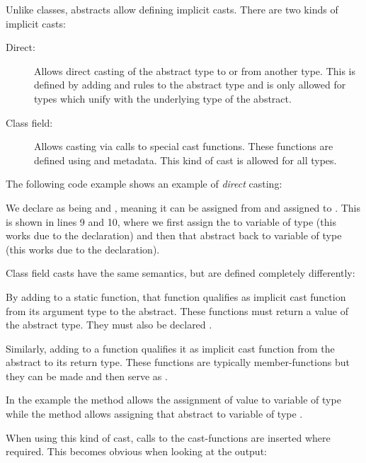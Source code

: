 Unlike classes, abstracts allow defining implicit casts. There are two kinds of implicit casts:

\begin{description}
	\item[Direct:] Allows direct casting of the abstract type to or from another type. This is defined by adding  and  rules to the abstract type and is only allowed for types which unify with the underlying type of the abstract.
	\item[Class field:] Allows casting via calls to special cast functions. These functions are defined using  and  metadata. This kind of cast is allowed for all types.
\end{description}
The following code example shows an example of \emph{direct} casting:

We declare  as being  and , meaning it can be assigned from  and assigned to . This is shown in lines 9 and 10, where we first assign the   to variable  of type  (this works due to the  declaration) and then that abstract back to variable  of type  (this works due to the  declaration).

Class field casts have the same semantics, but are defined completely differently:

By adding  to a static function, that function qualifies as implicit cast function from its argument type to the abstract. These functions must return a value of the abstract type. They must also be declared .

Similarly, adding  to a function qualifies it as implicit cast function from the abstract to its return type. These functions are typically member-functions but they can be made  and then serve as .

In the example the method  allows the assignment of value  to variable  of type  while the method  allows assigning that abstract to variable  of type .

When using this kind of cast, calls to the cast-functions are inserted where required. This becomes obvious when looking at the  output:

